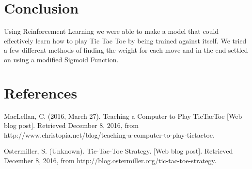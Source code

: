 \documentclass{article}
\begin{document}
\section{Conclusion}
Using Reinforcement Learning we were able to make a model that could effectively learn how to play Tic Tac Toe by being trained against itself. We tried a few different methods of finding the weight for each move and in the end settled on using a modified Sigmoid Function. 

\section*{References}

\begin{hangparas}{0.3cm}{1}
MacLellan, C. (2016, March 27). Teaching a Computer to Play TicTacToe [Web blog post]. Retrieved December 8, 2016, from http://www.christopia.net/blog/teaching-a-computer-to-play-tictactoe.
\end{hangparas}
\begin{hangparas}{0.3cm}{1}
Ostermiller, S. (Unknown). Tic-Tac-Toe Strategy. [Web blog post]. Retrieved December 8, 2016, from http://blog.ostermiller.org/tic-tac-toe-strategy.
\end{hangparas}
 
\end{document}
